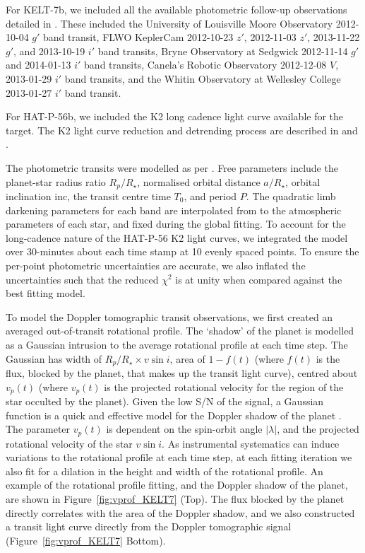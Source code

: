 \documentclass[useAMS,usenatbib]{mn2e}
\begin{document}
For KELT-7b, we included all the available photometric follow-up observations detailed in \citet{2015AJ....150...12B}. These included the University of Louisville Moore Observatory 2012-10-04 $g'$ band transit, FLWO KeplerCam 2012-10-23 $z'$, 2012-11-03 $z'$, 2013-11-22 $g'$, and 2013-10-19 $i'$ band transits, Bryne Observatory at Sedgwick 2012-11-14 $g'$ and 2014-01-13 $i'$ band transits, Canela's Robotic Observatory 2012-12-08 $V$, 2013-01-29 $i'$ band transits, and the Whitin Observatory at Wellesley College 2013-01-27 $i'$ band transit.

For HAT-P-56b, we included the K2 long cadence light curve available for the target. The K2 light curve reduction and detrending process are described in \citet{2015AJ....150...85H} and \citet{2015MNRAS.454.4159H}. 

The photometric transits were modelled as per \citet{2002ApJ...580L.171M}. Free parameters include the planet-star radius ratio $R_p/R_\star$, normalised orbital distance $a/R_\star$, orbital inclination inc, the transit centre time $T_0$, and period $P$. The quadratic limb darkening parameters for each band are interpolated from \citet{2000A&amp;A...363.1081C} to the atmospheric parameters of each star, and fixed during the global fitting. To account for the long-cadence nature of the HAT-P-56 K2 light curves, we integrated the model over 30-minutes about each time stamp at 10 evenly spaced points. To ensure the per-point photometric uncertainties are accurate, we also inflated the uncertainties such that the reduced $\chi^2$ is at unity when compared against the best fitting model. 

To model the Doppler tomographic transit observations, we first created an averaged out-of-transit rotational profile. The `shadow' of the planet is modelled as a Gaussian intrusion to the average rotational profile at each time step. The Gaussian has width of $R_p/R_\star \times v\sin i$, area of $1-f(t)$ (where $f(t)$ is the flux, blocked by the planet, that makes up the transit light curve), centred about $v_p(t)$ (where $v_p(t)$ is the projected rotational velocity for the region of the star occulted by the planet). Given the low S/N of the signal, a Gaussian function is a quick and effective model for the Doppler shadow of the planet \citep[e.g.][]{2016arXiv160200322C}. The parameter $v_p(t)$ is dependent on the spin-orbit angle $|\lambda|$, and the projected rotational velocity of the star $v \sin i$. As instrumental systematics can induce variations to the rotational profile at each time step, at each fitting iteration we also fit for a dilation in the height and width of the rotational profile. An example of the rotational profile fitting, and the Doppler shadow of the planet, are shown in Figure~\ref{fig:vprof_KELT7} (Top). The flux blocked by the planet directly correlates with the area of the Doppler shadow, and we also constructed a transit light curve directly from the Doppler tomographic signal (Figure~\ref{fig:vprof_KELT7} Bottom).
\end{document}
